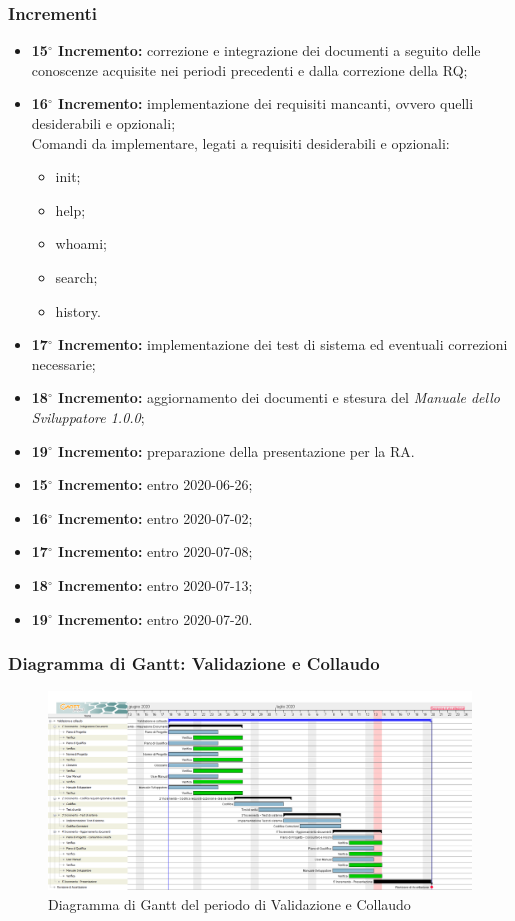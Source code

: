 	\subsubsection{Incrementi}
			\begin{itemize}
				\item \textbf{15$^{\circ}$ Incremento:} correzione e integrazione dei documenti a seguito delle conoscenze acquisite nei periodi precedenti e dalla correzione della RQ;
				\item \textbf{16$^{\circ}$ Incremento:} implementazione dei requisiti mancanti, ovvero quelli desiderabili e opzionali;\\
				Comandi da implementare, legati a requisiti desiderabili e opzionali:
					\begin{itemize}
						\item init;
						\item help;
						\item whoami;
						\item search;
						\item history.
					\end{itemize}
				\item \textbf{17$^{\circ}$ Incremento:} implementazione dei test di sistema ed eventuali correzioni necessarie;
				\item \textbf{18$^{\circ}$ Incremento:} aggiornamento dei documenti e stesura del \textit{Manuale dello Sviluppatore 1.0.0};
				\item \textbf{19$^{\circ}$ Incremento:} preparazione della presentazione per la RA.
			\end{itemize}
			\begin{itemize}
				\item \textbf{15$^{\circ}$ Incremento:} entro 2020-06-26;
				\item \textbf{16$^{\circ}$ Incremento:} entro 2020-07-02;
				\item \textbf{17$^{\circ}$ Incremento:} entro 2020-07-08;
				\item \textbf{18$^{\circ}$ Incremento:} entro 2020-07-13;
				\item \textbf{19$^{\circ}$ Incremento:} entro 2020-07-20.
			\end{itemize}
	\subsubsection{Diagramma di Gantt: Validazione e Collaudo}
		\begin{figure}[h]
			\centering
			\includegraphics[width=1.1\textwidth]{./res/img/DiagrammiGantt/validaz_gantt.png}
			\caption{Diagramma di Gantt del periodo di Validazione e Collaudo}
		\end{figure}
